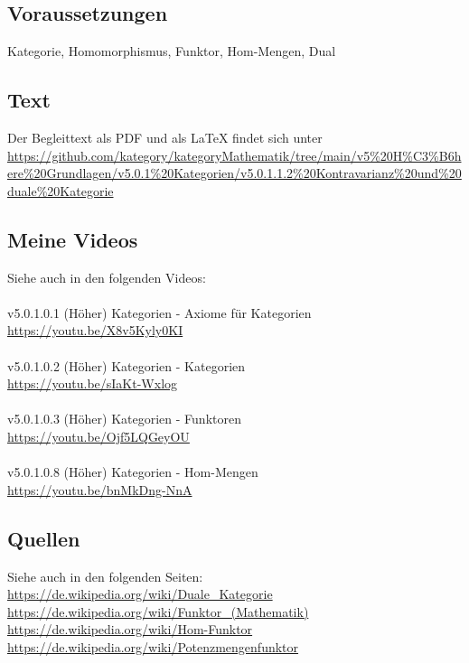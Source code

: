 \documentclass[a4paper]{amsart}
\theoremstyle{definition}
\begin{document}
\subsection*{Voraussetzungen}
Kategorie, Homomorphismus, Funktor, Hom-Mengen, Dual

\subsection*{Text}
Der Begleittext als PDF und als LaTeX findet sich unter
{\tiny
   \url{https://github.com/kategory/kategoryMathematik/tree/main/v5%20H%C3%B6here%20Grundlagen/v5.0.1%20Kategorien/v5.0.1.1.2%20Kontravarianz%20und%20duale%20Kategorie}
}

\subsection*{Meine Videos}
Siehe auch in den folgenden Videos:\\
\\
v5.0.1.0.1 (Höher) Kategorien - Axiome für Kategorien\\
\url{https://youtu.be/X8v5Kyly0KI}\\
\\
v5.0.1.0.2 (Höher) Kategorien - Kategorien\\
\url{https://youtu.be/sIaKt-Wxlog}\\
\\
v5.0.1.0.3 (Höher) Kategorien - Funktoren\\
\url{https://youtu.be/Ojf5LQGeyOU}\\
\\
v5.0.1.0.8 (Höher) Kategorien - Hom-Mengen\\
\url{https://youtu.be/bnMkDng-NnA}

\subsection*{Quellen}
Siehe auch in den folgenden Seiten:\\
\url{https://de.wikipedia.org/wiki/Duale_Kategorie}\\
\url{https://de.wikipedia.org/wiki/Funktor_(Mathematik)}\\
\url{https://de.wikipedia.org/wiki/Hom-Funktor}\\
\url{https://de.wikipedia.org/wiki/Potenzmengenfunktor}
\end{document}
